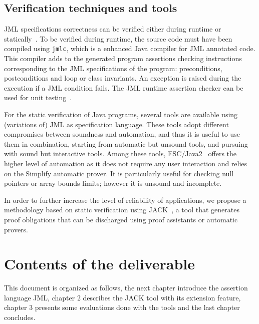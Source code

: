 \subsection{Verification techniques and tools}

JML specifications correctness can be verified either during runtime
or statically~\cite{BurdyCCEKLLP03}. To be verified during runtime, the
source code must have been compiled using \texttt{jmlc}, which is a
enhanced Java compiler for JML annotated code. This compiler adds to
the generated program assertions checking instructions corresponding
to the JML specifications of the program: preconditions, postconditions 
and loop or class invariants. An exception is raised during the execution 
if a JML condition fails. The JML runtime assertion checker can be used
for unit testing~\cite{CL02:ecoop}.


For the static verification of Java programs, several tools are
available using (variations of) JML as specification language. These
tools adopt different compromises between soundness and automation,
and thus it is useful to use them in combination, starting from
automatic but unsound tools, and pursuing with sound but interactive
tools.  Among these tools, ESC/Java2~\cite{CK04:cassis} offers the higher
level of automation as it does not require any user interaction and
relies on the Simplify automatic prover. It is particularly useful for
checking null pointers or array bounds limits; however it is unsound
and incomplete.

In order to further increase the level of reliability of applications,
we propose a methodology based on static verification using
JACK~\cite{BRL03:fme}, a tool that generates proof obligations that
can be discharged using proof assistants or automatic provers.

\section{Contents of the deliverable}
This document is organized as follows, the next chapter introduce the
assertion language JML, chapter 2 describes the JACK tool with its
extension feature, chapter 3 presents some evaluations done with the
tools and the last chapter concludes.

